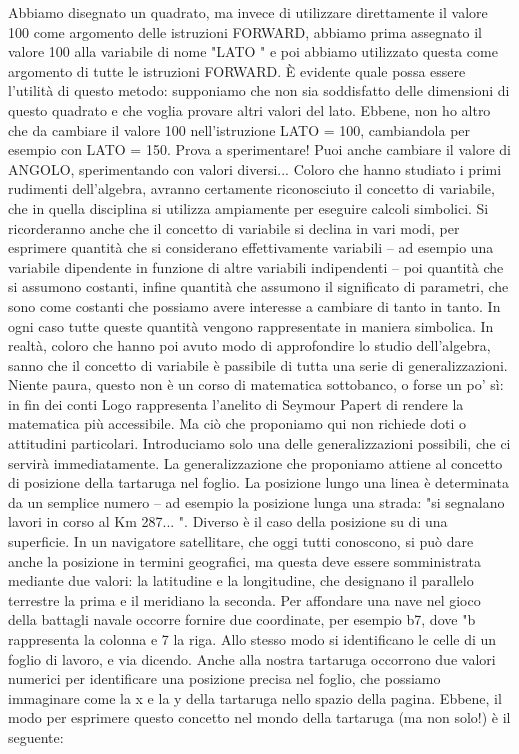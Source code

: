 Abbiamo disegnato un quadrato, ma invece di utilizzare direttamente il valore 100 come argomento delle istruzioni FORWARD, abbiamo prima assegnato il valore 100 alla variabile di nome  "LATO " e poi abbiamo utilizzato questa come argomento di tutte le istruzioni FORWARD. È evidente quale possa essere l'utilità di questo metodo: supponiamo che non sia soddisfatto delle dimensioni di questo quadrato e che voglia provare altri valori del lato. Ebbene, non ho altro che da cambiare il valore 100 nell'istruzione LATO = 100, cambiandola per esempio con LATO = 150. Prova a sperimentare! Puoi anche cambiare il valore di ANGOLO, sperimentando con valori diversi... 
Coloro che hanno studiato i primi rudimenti dell'algebra, avranno certamente riconosciuto il concetto di variabile, che in quella disciplina si utilizza ampiamente per eseguire calcoli simbolici. Si ricorderanno anche che il concetto di variabile si declina in vari modi, per esprimere quantità che si considerano effettivamente variabili – ad esempio una variabile dipendente in funzione di altre variabili indipendenti – poi quantità che si assumono costanti, infine quantità che assumono il significato di parametri, che sono come costanti che possiamo avere interesse a cambiare di tanto in tanto. In ogni caso tutte queste quantità vengono rappresentate in maniera simbolica. In realtà, coloro che hanno poi avuto modo di approfondire lo studio dell'algebra, sanno che il  concetto di variabile è passibile di tutta una serie di generalizzazioni. Niente paura, questo non è un corso di matematica sottobanco, o forse un po' sì: in fin dei conti Logo rappresenta l'anelito di Seymour Papert di rendere la matematica più accessibile. Ma ciò che proponiamo qui non richiede doti o attitudini particolari. Introduciamo solo una delle generalizzazioni possibili, che ci servirà immediatamente. La generalizzazione che proponiamo attiene al concetto di posizione della tartaruga nel foglio. La posizione lungo una linea è determinata da un semplice numero – ad esempio la posizione lunga una strada:  "si segnalano lavori in corso al Km 287... ". Diverso è il caso della posizione su di una superficie. In un  navigatore satellitare, che oggi tutti conoscono, si può dare anche la posizione in termini geografici, ma questa deve essere somministrata mediante due valori: la latitudine e la longitudine, che designano il parallelo terrestre la prima e il meridiano la seconda. Per affondare una nave nel gioco della battagli navale occorre fornire due coordinate, per esempio b7, dove  "b rappresenta la colonna e 7 la riga. Allo stesso modo si identificano le celle di un foglio di lavoro, e via dicendo. Anche alla nostra tartaruga occorrono due valori numerici per identificare una posizione precisa nel foglio, che possiamo immaginare come la x e la y della tartaruga nello spazio della pagina. Ebbene, il modo per esprimere questo concetto nel mondo della tartaruga (ma non solo!) è il seguente:


